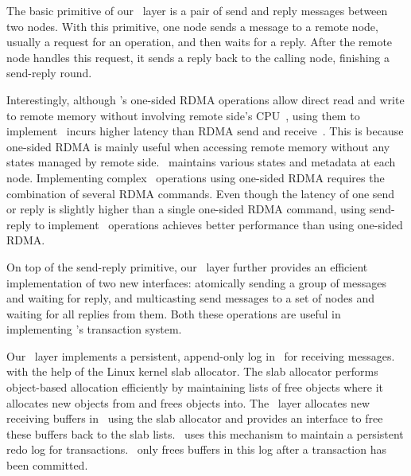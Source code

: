 
The basic primitive of our \ib\ layer is a pair of send and reply messages
between two nodes. 
With this primitive, one node sends a message to a remote node,
usually a request for an operation, and then waits for a reply.
After the remote node handles this request, it sends a reply back to the calling node,
finishing a send-reply round. 

Interestingly, although \ib's one-sided RDMA operations allow direct read and write to remote memory 
without involving remote side's CPU~\cite{Dragojevic14-NSDI}, 
using them to implement \hotpot\ incurs higher latency than RDMA send and receive~\cite{Kalia14-SIGCOMM}.
This is because one-sided RDMA is mainly useful when accessing remote memory without any states managed by remote side.
\hotpot\ maintains various states and metadata at each node. 
Implementing complex \hotpot\ operations using one-sided RDMA requires the combination of several RDMA commands.
Even though the latency of one send or reply is slightly higher than a single one-sided RDMA command,
using send-reply to implement \hotpot\ operations achieves better performance than using one-sided RDMA.

On top of the send-reply primitive, our \ib\ layer further provides an efficient implementation of 
two new interfaces:
atomically sending a group of messages and waiting for reply, 
and multicasting send messages to a set of nodes and waiting for all replies from them.
Both these operations are useful in implementing \hotpot's transaction system.

Our \ib\ layer implements a persistent, append-only log in \nvm\ for receiving messages.
with the help of the Linux kernel slab allocator.
The slab allocator performs object-based allocation efficiently 
by maintaining lists of free objects 
where it allocates new objects from and frees objects into.
The \ib\ layer allocates new receiving buffers in \nvm\ using the slab allocator
and provides an interface to free these buffers back to the slab lists.
\hotpot\ uses this mechanism to maintain a persistent redo log for transactions.
\hotpot\ only frees buffers in this log after a transaction has been committed.
\fi
